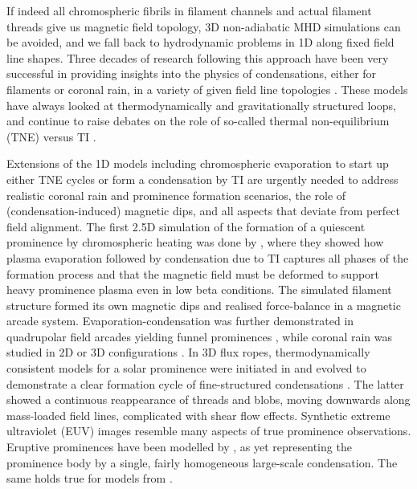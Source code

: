 If indeed all chromospheric fibrils in filament channels and actual filament threads give us magnetic field topology, 3D non-adiabatic MHD simulations can be avoided, and we fall back to hydrodynamic problems in 1D along fixed field line shapes. Three decades of research following this approach have been very successful in providing insights into the physics of condensations, either for filaments or coronal rain, in a variety of given field line topologies \citep{mok1990,antiochos2000,luna2012,xia2011}. These models have always looked at thermodynamically and gravitationally structured loops, and continue to raise debates on the role of so-called thermal non-equilibrium (\gls{TNE}) versus TI \citep{klimchuk2019,antolin2019}.

Extensions of the 1D models including chromospheric evaporation to start up either TNE cycles or form a condensation by TI are urgently needed to address realistic coronal rain and prominence formation scenarios, the role of (condensation-induced) magnetic dips, and all aspects that deviate from perfect field alignment. The first 2.5D simulation of the formation of a quiescent prominence by chromospheric heating was done by \citet{xia2012}, where they showed how plasma evaporation followed by condensation due to TI captures all phases of the formation process and that the magnetic field must be deformed to support heavy prominence plasma even in low beta conditions. The simulated filament structure formed its own magnetic dips and realised force-balance in a magnetic arcade system. Evaporation-condensation was further demonstrated in quadrupolar field arcades yielding funnel prominences \citep{keppens2014}, while coronal rain was studied in 2D \citep{fang2013,fang2015} or 3D configurations \citep{moschou2015, xia2017}. In 3D flux ropes, thermodynamically consistent models for a solar prominence were initiated in \citet{xia2014} and evolved to demonstrate a clear formation cycle of fine-structured condensations \citep{xia2016}. The latter showed a continuous reappearance of threads and blobs, moving downwards along mass-loaded field lines, complicated with shear flow effects. Synthetic extreme ultraviolet (\gls{EUV}) images resemble many aspects of true prominence observations. Eruptive prominences have been modelled by \citet{fan2017}, as yet representing the prominence body by a single, fairly homogeneous large-scale condensation. The same holds true for models from \citet{kaneko2015}.

